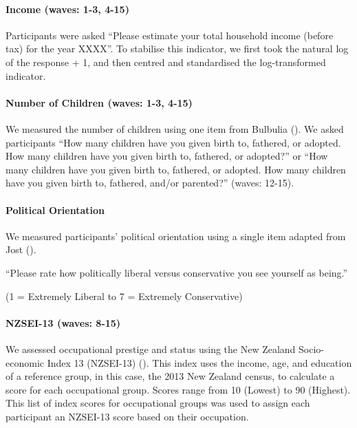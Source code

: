 \documentclass[
  singlecolumn]{article}
\let\oldparagraph\paragraph
\renewcommand{\paragraph}[1]{\oldparagraph{#1}\mbox{}}
\begin{document}
\paragraph{Income (waves: 1-3, 4-15)}\label{income-waves-1-3-4-15}

Participants were asked ``Please estimate your total household income
(before tax) for the year XXXX''. To stabilise this indicator, we first
took the natural log of the response + 1, and then centred and
standardised the log-transformed indicator.

\paragraph{Number of Children (waves: 1-3,
4-15)}\label{number-of-children-waves-1-3-4-15}

We measured the number of children using one item from Bulbulia
(). We asked participants ``How many
children have you given birth to, fathered, or adopted. How many
children have you given birth to, fathered, or adopted?'' or ``How many
children have you given birth to, fathered, or adopted. How many
children have you given birth to, fathered, and/or parented?'' (waves:
12-15).

\paragraph{Political Orientation}\label{political-orientation}

We measured participants' political orientation using a single item
adapted from Jost ().

``Please rate how politically liberal versus conservative you see
yourself as being.''

(1 = Extremely Liberal to 7 = Extremely Conservative)

\paragraph{NZSEI-13 (waves: 8-15)}\label{nzsei-13-waves-8-15}

We assessed occupational prestige and status using the New Zealand
Socio-economic Index 13 (NZSEI-13) (). This index uses the income, age, and education of
a reference group, in this case, the 2013 New Zealand census, to
calculate a score for each occupational group. Scores range from 10
(Lowest) to 90 (Highest). This list of index scores for occupational
groups was used to assign each participant an NZSEI-13 score based on
their occupation.
\end{document}
